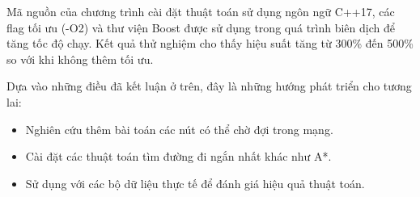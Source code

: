 \documentclass[../main.tex]{subfiles}
\begin{document}
Mã nguồn của chương trình cài đặt thuật toán sử dụng ngôn ngữ C++17, các flag tối ưu (-O2) và thư viện Boost được sử dụng trong quá trình biên dịch để tăng tốc độ chạy. Kết quả thử nghiệm cho thấy hiệu suất tăng từ 300\% đến 500\% so với khi không thêm tối ưu. 

Dựa vào những điều đã kết luận ở trên, đây là những hướng phát triển cho tương lai:

\begin{itemize}
    \item Nghiên cứu thêm bài toán các nút có thể chờ đợi trong mạng.
    \item Cài đặt các thuật toán tìm đường đi ngắn nhất khác như A*.
    \item Sử dụng với các bộ dữ liệu thực tế để đánh giá hiệu quả thuật toán.
\end{itemize}
\end{document}
